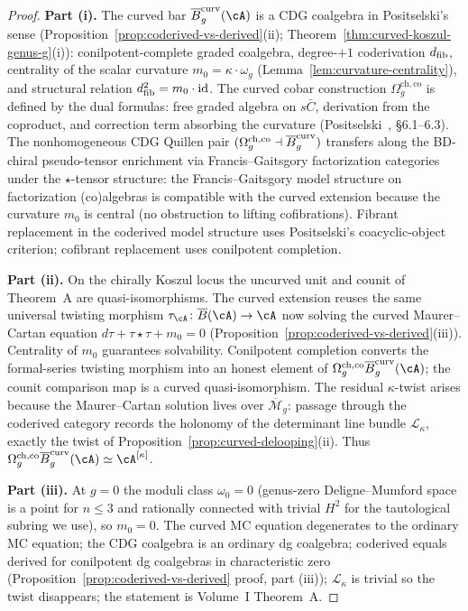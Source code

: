 \begin{proof}
\textbf{Part (i).} The curved bar $\barB^{\mathrm{curv}}_g(\cA)$
is a CDG coalgebra in Positselski's sense
(Proposition~\ref{prop:coderived-vs-derived}(ii);
Theorem~\ref{thm:curved-koszul-genus-g}(i)):
conilpotent-complete graded coalgebra, degree-$+1$ coderivation
$d_{\mathrm{fib}}$, centrality of the scalar curvature
$m_0 = \kappa \cdot \omega_g$
(Lemma~\ref{lem:curvature-centrality}), and structural relation
$d_{\mathrm{fib}}^2 = m_0 \cdot \mathrm{id}$. The curved cobar construction
$\Omega^{\mathrm{ch,co}}_g$ is defined by the dual formulas:
free graded algebra on $s\bar C$, derivation from the coproduct,
and correction term absorbing the curvature
(Positselski~\cite{Positselski2011}, \S6.1--6.3). The
nonhomogeneous CDG Quillen pair
$(\Omega^{\mathrm{ch,co}}_g \dashv \overline{B}^{\mathrm{curv}}_g)$
transfers along the BD-chiral pseudo-tensor enrichment via
Francis--Gaitsgory factorization categories~\cite{GR17} under
the $\star$-tensor structure: the Francis--Gaitsgory model
structure on factorization (co)algebras is compatible with the
curved extension because the curvature $m_0$ is central
(no obstruction to lifting cofibrations). Fibrant replacement
in the coderived model structure uses Positselski's
coacyclic-object criterion; cofibrant replacement uses
conilpotent completion.

\textbf{Part (ii).} On the chirally Koszul locus the uncurved
unit and counit of Theorem~A are quasi-isomorphisms. The curved
extension reuses the same universal twisting morphism
$\tau_\cA \colon \barB(\cA) \to \cA$ now solving the curved
Maurer--Cartan equation $d\tau + \tau \star \tau + m_0 = 0$
(Proposition~\ref{prop:coderived-vs-derived}(iii)). Centrality of
$m_0$ guarantees solvability. Conilpotent completion converts the
formal-series twisting morphism into an honest element of
$\Omega^{\mathrm{ch,co}}_g \barB^{\mathrm{curv}}_g(\cA)$; the
counit comparison map is a curved quasi-isomorphism. The residual
$\kappa$-twist arises because the Maurer--Cartan solution lives
over $\overline{\mathcal M}_g$: passage through the coderived
category records the holonomy of the determinant line bundle
$\mathcal{L}_\kappa$, exactly the twist of
Proposition~\ref{prop:curved-delooping}(ii). Thus
$\Omega^{\mathrm{ch,co}}_g \barB^{\mathrm{curv}}_g(\cA) \simeq
\cA^{[\kappa]}$.

\textbf{Part (iii).} At $g = 0$ the moduli class $\omega_0 = 0$
(genus-zero Deligne--Mumford space is a point for $n \leq 3$ and
rationally connected with trivial $H^2$ for the tautological
subring we use), so $m_0 = 0$. The curved MC equation degenerates
to the ordinary MC equation; the CDG coalgebra is an ordinary dg
coalgebra; coderived equals derived for conilpotent dg coalgebras
in characteristic zero
(Proposition~\ref{prop:coderived-vs-derived} proof, part (iii));
$\mathcal{L}_\kappa$ is trivial so the twist disappears; the
statement is Volume~I Theorem~A.
\end{proof}


